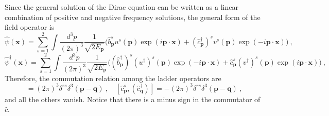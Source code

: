     Since the general solution of the Dirac equation can be written as a linear combination of positive and negative frequency solutions, the general form of the field operator is 
    \begin{equation*}
        \hat \psi(\mathbf x) = \sum_{s=1}^{2} \int \frac{d^3 p}{(2\pi)^3} \frac{1}{\sqrt{2 E_{\mathbf p}}} \Big ( \hat b^s_{\mathbf p} u^s (\mathbf p) \exp(i \mathbf p \cdot \mathbf x) + (\hat c_{\mathbf p}^\dagger)^s v^s(\mathbf p) \exp(- i \mathbf p \cdot \mathbf x) \Big) ~,
    \end{equation*}
    \begin{equation*}
        \hat \psi^\dagger (\mathbf x) = \sum_{s=1}^{2} \int \frac{d^3 p}{(2\pi)^3} \frac{1}{\sqrt{2 E_{\mathbf p}}} \Big ( (\hat b^\dagger_{\mathbf p})^s (u^\dagger)^s (\mathbf p) \exp(- i \mathbf p \cdot \mathbf x) + \hat c^s_{\mathbf p} (v^\dagger)^s(\mathbf p) \exp(i \mathbf p \cdot \mathbf x) \Big) ~,
    \end{equation*}
    Therefore, the commutation relation among the ladder operators are 
    \begin{equation*}
        [\hat b^s_{\mathbf p}, (\hat b^\dagger_{\mathbf q})] = (2\pi)^3 \delta^{rs} \delta^3 (\mathbf p - \mathbf q) ~, \quad [\hat c^s_{\mathbf p}, (\hat c^\dagger_{\mathbf q})] = - (2\pi)^3 \delta^{rs} \delta^3 (\mathbf p - \mathbf q) ~, 
    \end{equation*}
    and all the others vanish. Notice that there is a minus sign in the commutator of $\hat c$.
